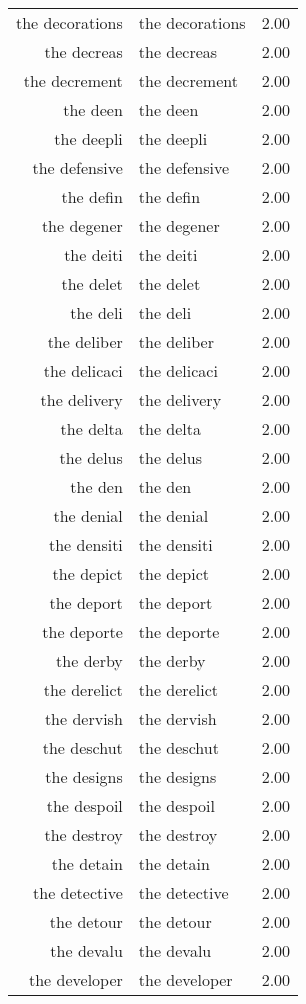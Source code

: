 \begin{table}[ht]
\begin{tabular}{rlr}
  the decorations & the decorations & 2.00 \\ 
  the decreas & the decreas & 2.00 \\ 
  the decrement & the decrement & 2.00 \\ 
  the deen & the deen & 2.00 \\ 
  the deepli & the deepli & 2.00 \\ 
  the defensive & the defensive & 2.00 \\ 
  the defin & the defin & 2.00 \\ 
  the degener & the degener & 2.00 \\ 
  the deiti & the deiti & 2.00 \\ 
  the delet & the delet & 2.00 \\ 
  the deli & the deli & 2.00 \\ 
  the deliber & the deliber & 2.00 \\ 
  the delicaci & the delicaci & 2.00 \\ 
  the delivery & the delivery & 2.00 \\ 
  the delta & the delta & 2.00 \\ 
  the delus & the delus & 2.00 \\ 
  the den & the den & 2.00 \\ 
  the denial & the denial & 2.00 \\ 
  the densiti & the densiti & 2.00 \\ 
  the depict & the depict & 2.00 \\ 
  the deport & the deport & 2.00 \\ 
  the deporte & the deporte & 2.00 \\ 
  the derby & the derby & 2.00 \\ 
  the derelict & the derelict & 2.00 \\ 
  the dervish & the dervish & 2.00 \\ 
  the deschut & the deschut & 2.00 \\ 
  the designs & the designs & 2.00 \\ 
  the despoil & the despoil & 2.00 \\ 
  the destroy & the destroy & 2.00 \\ 
  the detain & the detain & 2.00 \\ 
  the detective & the detective & 2.00 \\ 
  the detour & the detour & 2.00 \\ 
  the devalu & the devalu & 2.00 \\ 
  the developer & the developer & 2.00 \\ 

\end{tabular}
\end{table}
